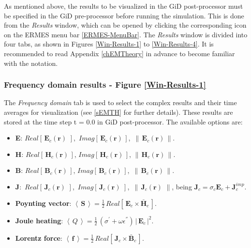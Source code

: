 As mentioned above, the results to be visualized in the GiD post-processor must be specified in the GiD pre-processor before running the simulation. This is done from the \textit{Results} window, which can be opened by clicking the corresponding icon on the ERMES menu bar \ref{ERMES-MenuBar}. The \textit{Results} window is divided into four tabs, as shown in Figures \ref{Win-Results-1} to \ref{Win-Results-4}. It is recommended to read Appendix \ref{chEMTheory} in advance to become familiar with the notation.

\subsubsection{Frequency domain results - Figure \ref{Win-Results-1}}

The \textit{Frequency domain} tab is used to select the complex results and their time averages for visualization (see \ref{sEMTH} for further details). These results are stored at the time step t = 0.0 in GiD post-processor. The available options are:

\begin{itemize}\itemsep0.25em 
	\item \textbf{E}: $Real\left[\,\mathbf{E}_{c}(\mathbf{r})\,\,\right]$, $\,Imag\left[\,\mathbf{E}_{c}(\mathbf{r})\,\right]$, $\,\left\|\,\mathbf{E}_{c}(\mathbf{r})\,\right\|$.
	\quad
	\item \textbf{H}: $Real\left[\,\mathbf{H}_{c}(\mathbf{r})\,\right]$, $Imag\left[\,\mathbf{H}_{c}(\mathbf{r})\,\right]$, $\left\|\,\mathbf{H}_{c}(\mathbf{r})\,\right\|$.
	\quad
	\item \textbf{B}: $Real\left[\,\mathbf{B}_{c}(\mathbf{r})\,\right]$, $Imag\left[\,\mathbf{B}_{c}(\mathbf{r})\,\right]$, $\,\left\|\,\mathbf{B}_{c}(\mathbf{r})\,\right\|$.
	\quad
	\item \textbf{J}: $\,Real\left[\,\mathbf{J}_{c}(\mathbf{r})\,\,\right]$, $\,Imag\left[\,\mathbf{J}_{c}(\mathbf{r})\,\,\right]$, $\,\left\|\,\mathbf{J}_{c}(\mathbf{r})\,\,\right\|$, being $\mathbf{J}_{c} = \sigma_{c}\mathbf{E}_{c} + \mathbf{J}_{c}^{imp}$.
	\quad
	\item \textbf{Poynting vector}: $\left\langle\,\mathbf{S}\,\right\rangle = \frac{1}{2}\, Real\left[\,\mathbf{E}_{c}\times\mathbf{\bar{H}}_{c}\,\right]$.
	\quad
	\item \textbf{Joule heating}: $\left\langle\,Q\,\right\rangle =\frac{1}{2}\,\left(\sigma^{'} + \omega\epsilon^{''}\right)\,\left|\,\mathbf{E}_{c}\,\right|^{2}$.
	\quad
	\item \textbf{Lorentz force}: $\left\langle\,\mathbf{f}\,\right\rangle = \frac{1}{2}\, Real\left[\,\mathbf{J}_{c}\times\mathbf{\bar{B}}_{c}\,\right]$.
\end{itemize}

